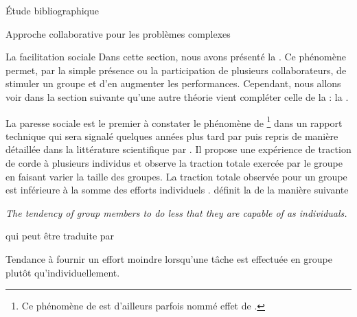 \documentclass[myfrancais,ngerman,english,french]{mythesis}
\begin{document}
\begin{mychapter}{Étude bibliographique}
\begin{mysection}{Approche collaborative pour les problèmes complexes}
\begin{mysubsection}{La facilitation sociale}
				Dans cette section, nous avons présenté la .
				Ce phénomène permet, par la simple présence ou la participation de plusieurs collaborateurs, de stimuler un groupe et d'en augmenter les performances.
				Cependant, nous allons voir dans la section suivante qu'une autre théorie vient compléter celle de la  : la .
			\end{mysubsection}
			\begin{mysubsection}{La paresse sociale}
				 est le premier à constater le phénomène de \footnote{Ce phénomène de  est d'ailleurs parfois nommé \og effet de  \fg.} dans un rapport technique qui sera signalé quelques années plus tard par  puis repris de manière détaillée dans la littérature scientifique par .
				Il propose une expérience de traction de corde à plusieurs individus et observe la traction totale exercée par le groupe en faisant varier la taille des groupes.
				La traction totale observée pour un groupe est inférieure à la somme des efforts individuels .
				 définit la  de la manière suivante
				\begin{myquote}[english]
					\it The tendency of group members to do less that they are capable of as individuals.
				\end{myquote}
				qui peut être traduite par
				\begin{myquote}[french]
					Tendance à fournir un effort moindre lorsqu'une tâche est effectuée en groupe plutôt qu'individuellement.
				\end{myquote}


\end{mysubsection}
\end{mysection}
\end{mychapter}
\end{document}
